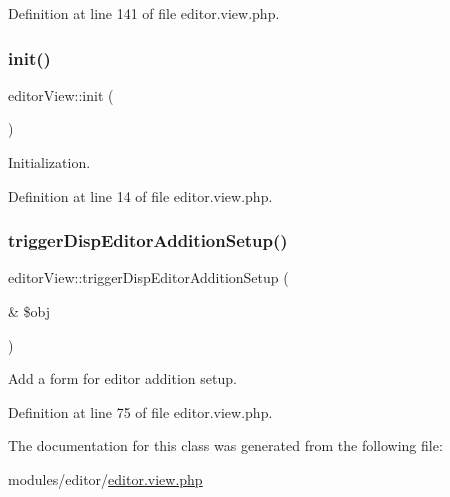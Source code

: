 Definition at line 141 of file editor.\+view.\+php.

\mbox{\label{classeditorView_af9e607b227f16e0bf0f1162a968197e9}} 
\subsubsection{\texorpdfstring{init()}{init()}}
{\footnotesize\ttfamily editor\+View\+::init (\begin{DoxyParamCaption}{ }\end{DoxyParamCaption})}



Initialization. 



Definition at line 14 of file editor.\+view.\+php.

\mbox{\label{classeditorView_a64fdf2f32fe2d617ae33162b41058d17}} 
\subsubsection{\texorpdfstring{trigger\+Disp\+Editor\+Addition\+Setup()}{triggerDispEditorAdditionSetup()}}
{\footnotesize\ttfamily editor\+View\+::trigger\+Disp\+Editor\+Addition\+Setup (\begin{DoxyParamCaption}\item[{\&}]{\$obj }\end{DoxyParamCaption})}



Add a form for editor addition setup. 



Definition at line 75 of file editor.\+view.\+php.



The documentation for this class was generated from the following file\+:\begin{DoxyCompactItemize}
\item 
modules/editor/\hyperlink{editor_8view_8php}{editor.\+view.\+php}\end{DoxyCompactItemize}
